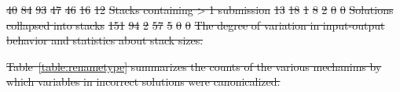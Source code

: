 \documentclass[12pt,twoside]{mitthesis}
\providecommand{\DIFdeltex}[1]{{\protect\color{red}\sout{#1}}}                      %
\providecommand{\DIFdelFL}[1]{\DIFdel{#1}} %
\providecommand{\DIFdel}[1]{\texorpdfstring{\DIFdeltex{#1}}{}} %
\begin{document}
\DIFdelFL{40 }%
\DIFdelFL{84 }%
\DIFdelFL{93 }%
\DIFdelFL{47 }%
\DIFdelFL{46 }%
\DIFdelFL{16 }%
\DIFdelFL{12 }%
\DIFdelFL{Stacks containing > 1 submission }%
\DIFdelFL{13 }%
\DIFdelFL{18 }%
\DIFdelFL{1 }%
\DIFdelFL{8 }%
\DIFdelFL{2 }%
\DIFdelFL{0 }%
\DIFdelFL{0 }%
\DIFdelFL{Solutions collapsed into stacks }%
\DIFdelFL{151 }%
\DIFdelFL{94 }%
\DIFdelFL{2 }%
\DIFdelFL{57 }%
\DIFdelFL{5 }%
\DIFdelFL{0 }%
\DIFdelFL{0 }%
{%
\DIFdelFL{The degree of variation in input-output behavior and statistics about stack sizes.}}

\DIFdel{Table~\ref{table:renametype} summarizes the counts of the various mechanims by which variables in incorrect solutions were canonicalized.
}%
\end{document}
